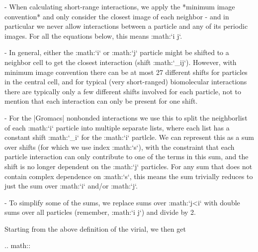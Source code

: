 -  When calculating short-range interactions, we apply the *minimum
   image convention* and only consider the closest image of each
   neighbor - and in particular we never allow interactions between a
   particle and any of its periodic images. For all the equations below,
   this means :math:`i \neq j`.

-  In general, either the :math:`i` or :math:`j` particle might be
   shifted to a neighbor cell to get the closest interaction (shift
   :math:`\delta_{ij}`). However, with minimum image convention there
   can be at most 27 different shifts for particles in the central cell,
   and for typical (very short-ranged) biomolecular interactions there
   are typically only a few different shifts involved for each particle,
   not to mention that each interaction can only be present for one
   shift.

-  For the |Gromacs| nonbonded interactions we use this to split the
   neighborlist of each :math:`i` particle into multiple separate lists,
   where each list has a constant shift :math:`\delta_i` for the
   :math:`i` partlcle. We can represent this as a sum over shifts (for
   which we use index :math:`s`), with the constraint that each particle
   interaction can only contribute to one of the terms in this sum, and
   the shift is no longer dependent on the :math:`j` particles. For any
   sum that does not contain complex dependence on :math:`s`, this means
   the sum trivially reduces to just the sum over :math:`i` and/or
   :math:`j`.

-  To simplify some of the sums, we replace sums over :math:`j<i` with
   double sums over all particles (remember, :math:`i \neq j`) and
   divide by 2.

Starting from the above definition of the virial, we then get

.. math::


